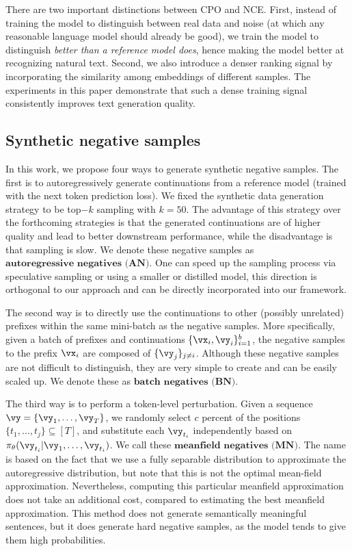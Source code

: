 There are two important distinctions between CPO and NCE. First, instead of training the model to distinguish between real data and noise (at which any reasonable language model should already be good), we train the model to distinguish \textit{better than a reference model does}, hence making the model better at recognizing natural text. Second, we also introduce a denser ranking signal by incorporating the similarity among embeddings of different samples. The experiments in this paper demonstrate that such a dense training signal consistently improves text generation quality.

\subsection{Synthetic negative samples}
In this work, we propose four ways to generate synthetic negative samples. The first is to autoregressively generate continuations from a reference model (trained with the next token prediction loss). We fixed the synthetic data generation strategy to be top$-k$ sampling with $k=50$. The advantage of this strategy over the forthcoming strategies is that the generated continuations are of higher quality and lead to better downstream performance, while the disadvantage is that sampling is slow. We denote these negative samples as $\textbf{autoregressive negatives (AN)}$.  One can speed up the sampling process via speculative sampling \citep{chen2023accelerating} or using a smaller or distilled model, this direction is orthogonal to our approach and can be directly incorporated into our framework. 

The second way is to directly use the continuations to other (possibly unrelated) prefixes within the same mini-batch as the negative samples. More specifically, given a batch of prefixes and continuations $\{\vx_i, \vy_i\}_{i=1}^b$, the negative samples to the prefix $\vx_i$ are composed of $\{\vy_j\}_{j\neq i}$. Although these negative samples are not difficult to distinguish, they are very simple to create and can be easily scaled up. We denote these as $\textbf{batch negatives (BN)}$.

The third way is to perform a token-level perturbation. Given a sequence $\vy = \{\vy_1,\ldots, \vy_T\}$, we randomly select $c$ percent of the positions $\{t_1,\ldots, t_j\}\subseteq [T]$, and substitute each $\vy_{t_i}$ independently based on $\pi_\theta(\vy_{t_i}|\vy_1,\ldots,\vy_{t_i})$. We call these $\textbf{meanfield negatives (MN)}$. The name is based on the fact that we use a fully separable distribution to approximate the autoregressive distribution, but note that this is not the optimal mean-field approximation. Nevertheless, computing this particular meanfield approximation does not take an additional cost, compared to estimating the best meanfield approximation. This method does not generate semantically meaningful sentences, but it does generate hard negative samples, as the model tends to give them high probabilities. 

